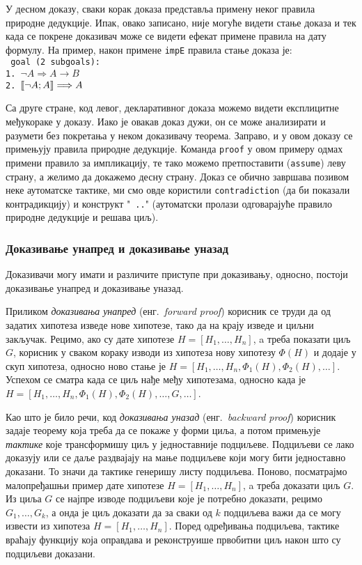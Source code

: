У десном доказу, сваки корак доказа представља примену неког правила
природне дедукције. Ипак, овако записано, није могуће видети стање
доказа и тек када се покрене доказивач може се видети ефекат примене
правила на дату формулу. На пример, након примене {\tt impE} правила
стање доказа је: \\
{\tt
goal (2 subgoals): \\
 1. $\neg A \Longrightarrow A \longrightarrow B$ \\
 2. $\llbracket \neg A; A \rrbracket \Longrightarrow A$
}

Са друге стране, код левог, декларативног доказа можемо видети
експлицитне међукораке у доказу. Иако је овакав доказ дужи, он се може
анализирати и разумети без покретања у неком доказивачу
теорема. Заправо, и у овом доказу се примењују правила природне
дедукције. Команда {\tt proof} у овом примеру одмах примени правило за
импликацију, те тако можемо претпоставити ({\tt assume}) леву страну,
а желимо да докажемо десну страну. Доказ се обично завршава позивом
неке аутоматске тактике, ми смо овде користили {\tt contradiction} (да
би показали контрадикцију) и конструкт "{\tt
  ..}" (аутоматски пролази одговарајуће правило
природне дедукције и решава циљ).

\subsubsection{Доказивање унапред и доказивање уназад}

Доказивачи могу имати и различите приступе при доказивању, односно,
постоји доказивање унапред и доказивање уназад.

Приликом \emph{доказивања унапред} (енг.~\emph{forward proof})
корисник се труди да од задатих хипотеза изведе нове хипотезе, тако да
на крају изведе и циљни закључак. Рецимо, ако су дате хипотезе $H =
[H_1, \ldots, H_n]$, a треба показати циљ $G$, корисник у сваком
кораку изводи из хипотеза нову хипотезу $\Phi(H)$ и додаје у скуп
хипотеза, односно ново стање је $H = [H_1, \ldots, H_n, \Phi_1(H),
  \Phi_2(H), \ldots]$. Успехом се сматра када се циљ нађе међу
хипотезама, односно када је $H = [H_1, \ldots, H_n, \Phi_1(H),
  \Phi_2(H), \ldots, G, \ldots]$.

Као што је било речи, код \emph{доказивања уназад}
(енг.~\emph{backward proof}) корисник задаје теорему која треба да се
покаже у форми циља, а потом примењује \emph{тактике} које
трансформишу циљ у једноставније подциљеве. Подциљеви се лако доказују
или се даље раздвајају на мање подциљеве који могу бити једноставно
доказани. То значи да тактике генеришу листу подциљева. Поново,
посматрајмо малопређашњи пример дате хипотезе $H = [H_1, \ldots,
  H_n]$, a треба доказати циљ $G$. Из циља $G$ се најпре изводе
подциљеви које је потребно доказати, рецимо $G_1, \ldots, G_k$, а онда
је циљ доказати да за сваки од $k$ подциљева важи да се могу извести
из хипотеза $H = [H_1, \ldots, H_n]$. Поред одређивања подциљева,
тактике враћају функцију која оправдава и реконструише првобитни циљ
након што су подциљеви доказани.

